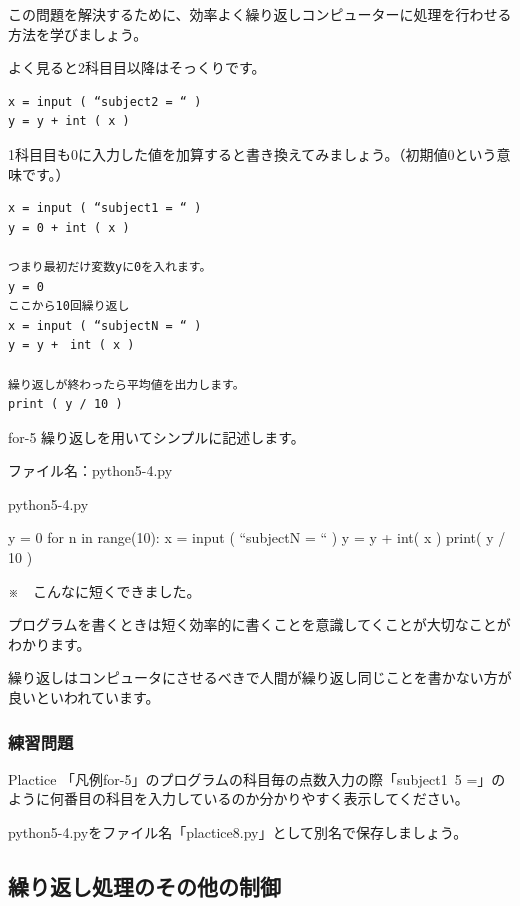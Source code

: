 \documentclass[11pt,a4paper,dvipdfmx,titlepage]{jsreport}
\begin{document}
この問題を解決するために、効率よく繰り返しコンピューターに処理を行わせる方法を学びましょう。

よく見ると2科目目以降はそっくりです。

\begin{verbatim}
x = input ( “subject2 = “ )
y = y + int ( x ) 
\end{verbatim}

1科目目も0に入力した値を加算すると書き換えてみましょう。（初期値0という意味です。）
\begin{verbatim}
x = input ( “subject1 = “ )
y = 0 + int ( x ) 

つまり最初だけ変数yに0を入れます。
y = 0
ここから10回繰り返し
x = input ( “subjectN = “ )
y = y +　int ( x )

繰り返しが終わったら平均値を出力します。
print ( y / 10 )
\end{verbatim}

\begin{pabox}{for-5}
繰り返しを用いてシンプルに記述します。

ファイル名：python5-4.py
\begin{codebox}{python5-4.py}
\begin{listing}{1}
y = 0
for n in range(10):
    x = input ( “subjectN = “ )
    y = y + int( x )
print( y / 10 )
\end{listing}
\end{codebox}
※　こんなに短くできました。

\end{pabox}

プログラムを書くときは短く効率的に書くことを意識してくことが大切なことがわかります。

繰り返しはコンピュータにさせるべきで人間が繰り返し同じことを書かない方が良いといわれています。

\subsubsection{練習問題}
\begin{plabox}{Plactice}
「凡例for-5」のプログラムの科目毎の点数入力の際「subject1~5 =」のように何番目の科目を入力しているのか分かりやすく表示してください。

python5-4.pyをファイル名「plactice8.py」として別名で保存しましょう。

\end{plabox}
\subsection{繰り返し処理のその他の制御}
\end{document}
